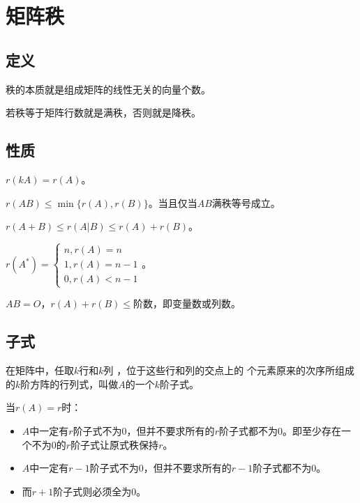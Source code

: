 \documentclass[UTF8, 12pt]{ctexart}
\begin{document}
\section{矩阵秩}

\subsection{定义}

秩的本质就是组成矩阵的线性无关的向量个数。

若秩等于矩阵行数就是满秩，否则就是降秩。

\subsection{性质}

$r(kA)=r(A)$。

$r(AB)\leqslant\min\{r(A),r(B)\}$。当且仅当$AB$满秩等号成立。

$r(A+B)\leqslant r(A|B)\leqslant r(A)+r(B)$。

$r(A^*)=\left\{\begin{array}{l}
    n, r(A)=n \\
    1, r(A)=n-1 \\
    0, r(A)<n-1
\end{array}\right.$。

$AB=O$，$r(A)+r(B)\leqslant$阶数，即变量数或列数。



\subsection{子式}

在矩阵中，任取$k$行和$k$列 ，位于这些行和列的交点上的 个元素原来的次序所组成的$k$阶方阵的行列式，叫做$A$的一个$k$阶子式。

当$r(A)=r$时：

\begin{itemize}
    \item $A$中一定有$r$阶子式不为0，但并不要求所有的$r$阶子式都不为0。即至少存在一个不为0的$r$阶子式让原式秩保持$r$。
    \item $A$中一定有$r-1$阶子式不为0，但并不要求所有的$r-1$阶子式都不为0。
    \item 而$r+1$阶子式则必须全为0。
\end{itemize}
\end{document}
